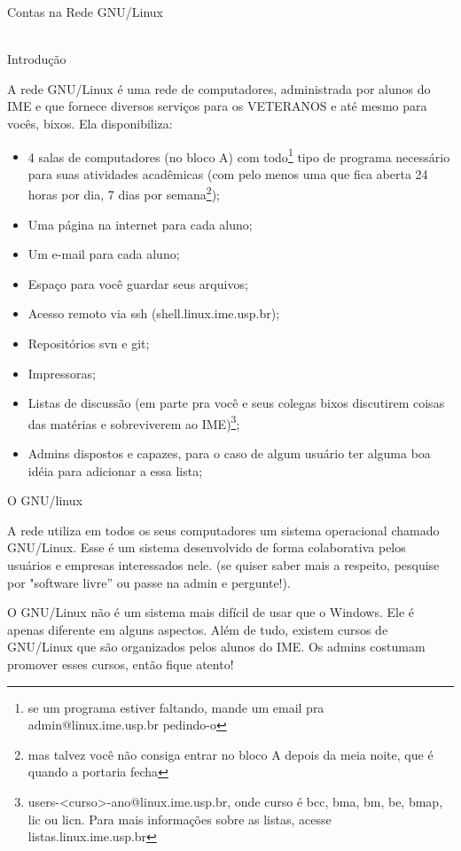 \begin{secao}{Contas na Rede GNU/Linux}
\\
\\
\begin{subsecao}{Introdução}

A rede GNU/Linux é uma rede de computadores, administrada por alunos do IME e
que fornece diversos serviços para os VETERANOS e até mesmo para vocês, bixos.
Ela disponibiliza:

\begin{itemize}
\item 4 salas de computadores (no bloco A) com todo\footnote{se um programa
estiver faltando, mande um email pra admin@linux.ime.usp.br pedindo-o} tipo de
programa necessário para suas atividades acadêmicas (com pelo menos uma que fica
aberta 24 horas por dia, 7 dias por semana\footnote{mas
talvez você não consiga entrar no bloco A depois da meia noite, que é quando a
portaria fecha});
\item Uma página na internet para cada aluno;
\item Um e-mail para cada aluno;
\item Espaço para você guardar seus arquivos;
\item Acesso remoto via ssh (shell.linux.ime.usp.br);
\item Repositórios svn e git;
\item Impressoras;
\item Listas de discussão (em parte pra você e seus colegas bixos discutirem
coisas das matérias e sobreviverem ao IME)\footnote{
users-<curso>-ano@linux.ime.usp.br, onde curso é bcc, bma, bm, be, bmap, lic ou
licn. Para mais informações sobre as listas, acesse listas.linux.ime.usp.br};
\item Admins dispostos e capazes, para o caso de algum usuário ter alguma boa
idéia para adicionar a essa lista;
\end{itemize}
\end{subsecao}

\begin{subsecao}{O GNU/linux }

A rede utiliza em todos os seus computadores um sistema operacional chamado
GNU/Linux. Esse é um sistema desenvolvido de forma colaborativa pelos usuários
e empresas interessados nele. (se quiser saber mais a respeito, pesquise
por "software livre” ou passe na admin e pergunte!).

O GNU/Linux não é um sistema mais difícil de usar que o Windows. Ele é apenas
diferente em alguns aspectos. Além de tudo, existem cursos de GNU/Linux que são
organizados pelos alunos do IME. Os admins costumam promover esses cursos, então
fique atento!


\end{subsecao}
\end{secao}

